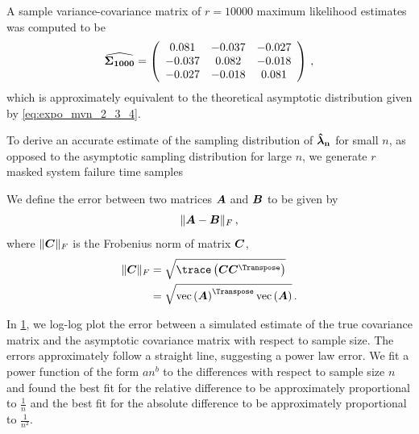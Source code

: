 \documentclass[
    11pt,
    extrafontsizes,
    article,
    oldfontcommands,
    final,
    oneside,
    openany,
    hidelinks]{memoir}
\begin{document}
A sample variance-covariance matrix of $r=10000$ maximum likelihood estimates 
was computed to be
\begin{equation}
    \widehat{\boldsymbol{\Sigma_{1000}}} =
    \left(
        \begin{array}{ccc}
            0.081  &   -0.037 &   -0.027\\
            -0.037 &   0.082  &   -0.018\\
            -0.027 &   -0.018 &   0.081
        \end{array}
    \right)\,,
\end{equation}
which is approximately equivalent to the theoretical asymptotic distribution given by \cref{eq:expo_mvn_2_3_4}.

\begin{figure}
\begin{center}

\end{center}
\end{figure}

To derive an accurate estimate of the sampling distribution of $\boldsymbol{\mathbf{\hat{\boldsymbol{\mathbf{\lambda}}}_n}}$ for small $n$, as opposed to the asymptotic sampling distribution for large $n$, we generate $r$ masked system failure time samples

\begin{figure}
\label{fig:frob_error}
\begin{center}

\end{center}
\end{figure}

We define the error between two matrices $\boldsymbol{A}$ and $\boldsymbol{B}$ to be given by
\begin{equation}
    \lVert \boldsymbol{A} - \boldsymbol{B} \rVert_F\,,
\end{equation}
where $\lVert \boldsymbol{C} \rVert_F$ is the Frobenius norm of matrix $\boldsymbol{C}$,
\begin{align}
    \lVert \matrx{C} \rVert_F
        &= \sqrt{\trace \left( \matrx{C} \matrx{C^\Transpose}\right)}\\
        &= \sqrt{\vt{\matrx{A}}^\Transpose \vt{\matrx{A}}}\,.
\end{align}

In \cref{fig:frob_error}, we log-log plot the error between a simulated estimate of the true covariance matrix and the asymptotic covariance matrix with respect to sample size. The errors approximately follow a straight line, suggesting a power law error. We fit a power function of the form $a n^b$ to the differences with respect to sample size $n$ and found the best fit for the relative difference to be approximately proportional to $\frac{1}{n}$ and the best fit for the absolute difference to be approximately proportional to $\frac{1}{n^2}$.
\end{document}
